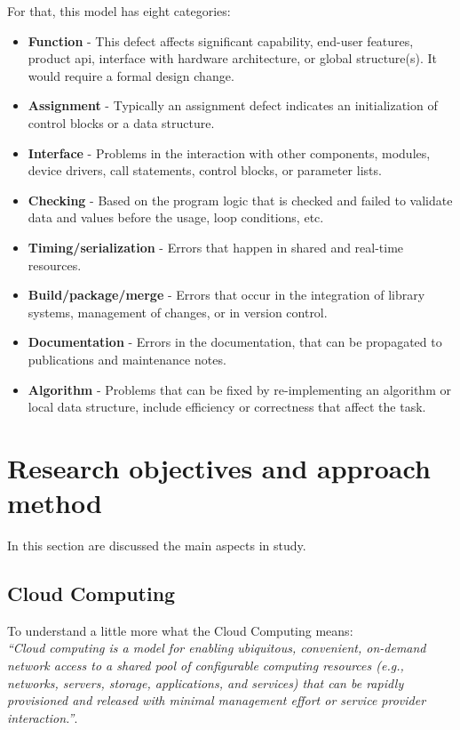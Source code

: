 For that, this model has eight categories:

\begin{itemize}
	\item \textbf{Function} - This defect affects significant capability, end-user features, product \acl{api}, interface with hardware architecture, or global structure(s). It would require a formal design change.
	\item \textbf{Assignment} - Typically an assignment defect indicates an initialization of control blocks or a data structure.
	\item \textbf{Interface} - Problems in the interaction with other components, modules, device drivers, call statements, control blocks, or parameter lists.
	\item \textbf{Checking} - Based on the program logic that is checked and failed to validate data and values before the usage, loop conditions, etc.
	\item \textbf{Timing/serialization} - Errors that happen in shared and real-time resources.
	\item \textbf{Build/package/merge} - Errors that occur in the integration of library systems, management of changes, or in version control.
	\item \textbf{Documentation} - Errors in the documentation, that can be propagated to publications and maintenance notes.
	\item \textbf{Algorithm} - Problems that can be fixed by re-implementing an algorithm or local data structure, include efficiency or correctness that affect the task.
\end{itemize}


\newpage
\section{Research objectives and approach method}

In this section are discussed the main aspects in study.

\subsection{Cloud Computing}



To understand a little more what the Cloud Computing means:\\

\textit{``Cloud computing is a model for enabling ubiquitous, convenient, on-demand network access to a shared pool of configurable computing resources (e.g., networks, servers, storage, applications, and services) that can be rapidly provisioned and released with minimal management effort or service provider interaction.''}\cite{mell2011nist}.\\

